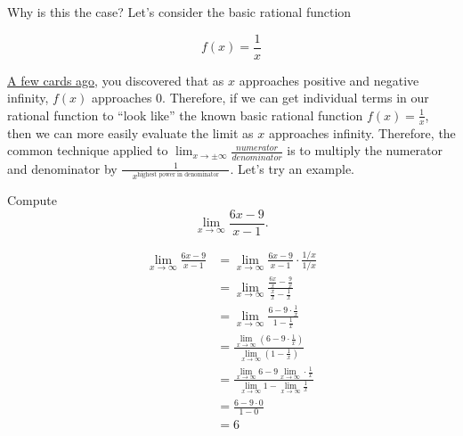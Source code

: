 \documentclass{ximera}
\begin{document}
Why is this the case? Let's consider the basic rational function

\[
f(x) = \frac{1}{x}
\]
\begin{image}
\end{image}

\href{https://ximera.osu.edu/math160fa17/m160exam1content/asymptotesAsLimits/breakGround}{A few cards ago}, you discovered that as $x$ approaches positive and negative infinity, $f(x)$ approaches $0$. Therefore, if we can get individual terms in our rational function to ``look like'' the known basic rational function $f(x)=\frac{1}{x}$, then we can more easily evaluate the limit as $x$ approaches infinity. Therefore, the common technique applied to $\displaystyle\lim_{x\to \pm \infty}\frac{numerator}{denominator}$ is to multiply the numerator and denominator by $\displaystyle\frac{1}{\phantom{xx}x^{\text{highest power in denominator}}\phantom{xx}}$.  Let's try an example. 

\begin{example} Compute
\[
\lim_{x\to\infty} \frac{6x-9}{x-1}.
\]
\begin{explanation}
\begin{align*}
\lim_{x\to\infty}\frac{6x-9}{x-1} &= \lim_{x\to\infty}\frac{6x-9}{x-1}\cdot \frac{1/x}{1/x}\\
&=\lim_{x\to\infty}\frac{\frac{6x}{x} - \frac{9}{x}}{\frac{x}{x} - \frac{1}{x}}\\
&=\lim_{x\to\infty}\frac{6 - 9 \cdot \frac{1}{x}}{1 - \frac{1}{x}}\\
&=\frac{\displaystyle\lim_{x\to\infty} \left( 6 - 9 \cdot \frac{1}{x}\right)}{\displaystyle\lim_{x\to\infty} \left( 1 - \frac{1}{x} \right)} \\
&=\frac{\displaystyle\lim_{x\to\infty} 6 - 9 \displaystyle\lim_{x\to\infty} \cdot \frac{1}{x}}{\displaystyle\lim_{x\to\infty} 1 - \displaystyle\lim_{x\to\infty} \frac{1}{x}} \\
&=\frac{6 - 9 \cdot 0}{1 - 0} \\
&= 6
\end{align*}
\end{explanation}
\end{example}
\end{document}
